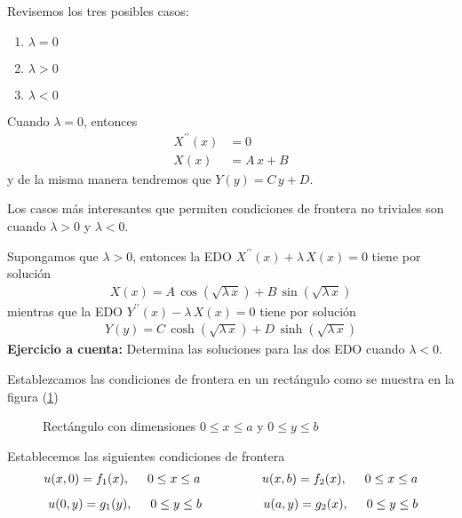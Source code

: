 Revisemos los tres posibles casos:
\begin{enumerate}[label=\roman*)]
\item $\lambda = 0$
\item $\lambda > 0$
\item $\lambda < 0$
\end{enumerate}
Cuando $\lambda = 0$, entonces 
\begin{align*}
X^{\prime \prime}(x) &= 0 \\
X(x) &= A \, x + B
\end{align*}
y de la misma manera tendremos que $Y(y) = C \, y + D$.
\par
Los casos más interesantes que permiten condiciones de frontera no triviales son cuando $\lambda > 0$ y $\lambda < 0$.
\par
Supongamos que $\lambda > 0$, entonces la EDO $X^{\prime \prime} (x) + \lambda \, X(x) = 0 $ tiene por solución
\begin{align*}
X(x) = A \, \cos (\sqrt{\lambda \, x}) + B \, \sin (\sqrt{\lambda \, x})
\end{align*}
mientras que la EDO $Y^{\prime \prime} (x) - \lambda \, X(x) = 0 $ tiene por solución
\begin{align*}
Y(y) = C \, \cosh (\sqrt{\lambda \, x}) + D \, \sinh (\sqrt{\lambda \, x})
\end{align*}
\textbf{Ejercicio a cuenta: } Determina las soluciones para las dos EDO cuando $\lambda < 0$.
\par
Establezcamos las condiciones de frontera en un rectángulo como se muestra en la figura (\ref{fig:figura_ecalor_01})
\begin{figure}[!h]
    \centering
    
    \caption{Rectángulo con dimensiones $0 \leq x \leq a$ y $0 \leq y \leq b$}
    \label{fig:figura_ecalor_01}
\end{figure}
Establecemos las siguientes condiciones de frontera
\begin{align*}
u(x, 0) = f_{1} (x), \hspace{0.5cm} 0 \leq x \leq a \hspace{1.75cm} u(x, b) = f_{2} (x), \hspace{0.5cm} 0 \leq x \leq a \\[0.5em]
u(0, y) = g_{1} (y), \hspace{0.5cm} 0 \leq y \leq b \hspace{1.75cm} u(a, y) = g_{2} (x), \hspace{0.5cm} 0 \leq y \leq b 
\end{align*}
